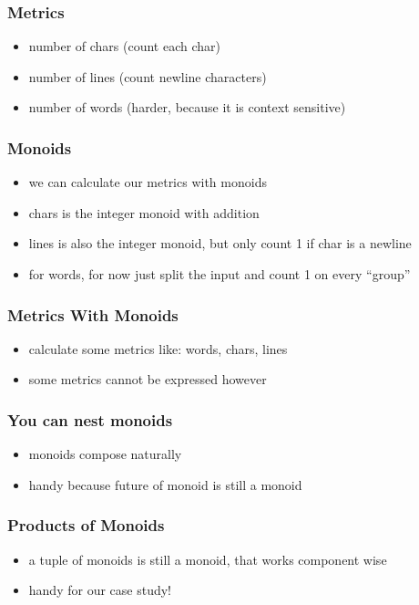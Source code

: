\documentclass{beamer}
\begin{document}
\begin{frame}
  \frametitle{Metrics}
  \begin{itemize}
  \item number of chars (count each char)
  \item number of lines (count newline characters)
  \item number of words (harder, because it is context sensitive)
  \end{itemize}
\end{frame}

\begin{frame}
  \frametitle{Monoids}
  \begin{itemize}
  \item we can calculate our metrics with monoids
  \item chars is the integer monoid with addition
  \item lines is also the integer monoid, but only count 1 if char is a newline
  \item for words, for now just split the input and count 1 on every ``group''
  \end{itemize}
\end{frame}

\begin{frame}
  \frametitle{Metrics With Monoids}
  \begin{itemize}
  \item calculate some metrics like: words, chars, lines
  \item some metrics cannot be expressed however
  \end{itemize}
\end{frame}

\begin{frame}
  \frametitle{You can nest monoids}
  \begin{itemize}
  \item monoids compose naturally
  \item handy because future of monoid is still a monoid
  \end{itemize}
\end{frame}

\begin{frame}
  \frametitle{Products of Monoids}
  \begin{itemize}
  \item a tuple of monoids is still a monoid, that works component wise
  \item handy for our case study!
  \end{itemize}
\end{frame}
\end{document}

